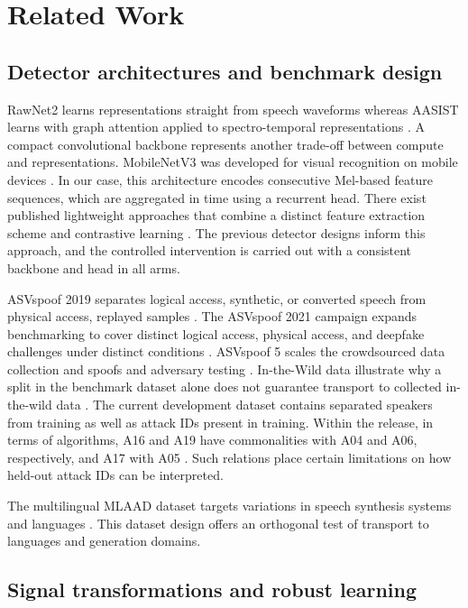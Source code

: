 \section{Related Work}\label{sec:related}

\subsection{Detector architectures and benchmark design}

RawNet2 learns representations straight from speech waveforms whereas AASIST learns with graph attention applied to spectro-temporal representations \cite{rawnet,aasist}. A compact convolutional backbone represents another trade-off between compute and representations. MobileNetV3 was developed for visual recognition on mobile devices \cite{mobile}. In our case, this architecture encodes consecutive Mel-based feature sequences, which are aggregated in time using a recurrent head. There exist published lightweight approaches that combine a distinct feature extraction scheme and contrastive learning \cite{din}. The previous detector designs inform this approach, and the controlled intervention is carried out with a consistent backbone and head in all arms.

ASVspoof 2019 separates logical access, synthetic, or converted speech from physical access, replayed samples \cite{asv19}. The ASVspoof 2021 campaign expands benchmarking to cover distinct logical access, physical access, and deepfake challenges under distinct conditions \cite{asv21}. ASVspoof 5 scales the crowdsourced data collection and spoofs and adversary testing \cite{asv5}. In-the-Wild data illustrate why a split in the benchmark dataset alone does not guarantee transport to collected in-the-wild data \cite{wild}. The current development dataset contains separated speakers from training as well as attack IDs present in training. Within the release, in terms of algorithms, A16 and A19 have commonalities with A04 and A06, respectively, and A17 with A05 \cite{asv19}. Such relations place certain limitations on how held-out attack IDs can be interpreted.

The multilingual MLAAD dataset targets variations in speech synthesis systems and languages \cite{mlaad}. This dataset design offers an orthogonal test of transport to languages and generation domains.

\subsection{Signal transformations and robust learning}

